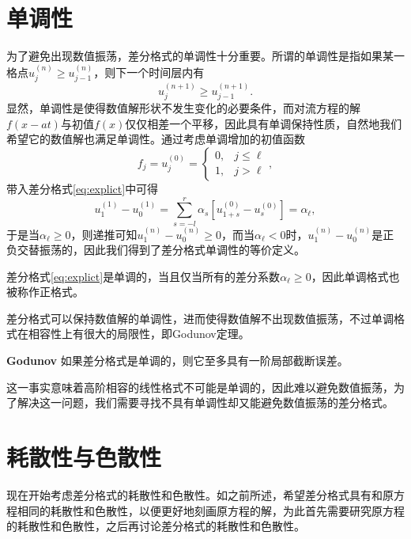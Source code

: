 \documentclass[a4paper,10pt]{ctexart}
\begin{document}
\section{单调性}
为了避免出现数值振荡，差分格式的单调性十分重要。所谓的单调性是指如果某一格点$ u^{(n)}_j\geqslant u^{(n)}_{j-1} $，则下一个时间层内有
\[
    u^{(n+1)}_j\geqslant u^{(n+1)}_{j-1}.
\]
显然，单调性是使得数值解形状不发生变化的必要条件，而对流方程的解$ f(x-at) $与初值$ f(x) $仅仅相差一个平移，因此具有单调保持性质，自然地我们希望它的数值解也满足单调性。通过考虑单调增加的初值函数
\[
    f_j = u^{(0)}_j = 
    \begin{cases}
        0, &j\leqslant \ell\\
        1, &j>\ell
    \end{cases},
\]
带入差分格式\eqref{eq:explict}中可得
\[
    u^{(1)}_1 - u^{(1)}_0 = \sum_{s=-l}^r \alpha_s [u^{(0)}_{1+s} - u^{(0)}_s] = \alpha_\ell,
\]
于是当$ \alpha_\ell\geqslant 0 $，则递推可知$ u^{(n)}_1 - u^{(n)}_0\geqslant 0 $，而当$ \alpha_\ell<0 $时，$ u^{(n)}_1 - u^{(n)}_0 $是正负交替振荡的，因此我们得到了差分格式单调性的等价定义。
\begin{definition}
    差分格式\eqref{eq:explict}是单调的，当且仅当所有的差分系数$ \alpha_\ell\geqslant 0 $，因此单调格式也被称作正格式。
\end{definition}
差分格式可以保持数值解的单调性，进而使得数值解不出现数值振荡，不过单调格式在相容性上有很大的局限性，即Godunov定理。
\begin{theorem}{\normalfont\bf{Godunov}}
    如果差分格式是单调的，则它至多具有一阶局部截断误差。
\end{theorem}
这一事实意味着高阶相容的线性格式不可能是单调的，因此难以避免数值振荡，为了解决这一问题，我们需要寻找不具有单调性却又能避免数值振荡的差分格式。

\section{耗散性与色散性}
现在开始考虑差分格式的耗散性和色散性。如之前所述，希望差分格式具有和原方程相同的耗散性和色散性，以便更好地刻画原方程的解，为此首先需要研究原方程的耗散性和色散性，之后再讨论差分格式的耗散性和色散性。
\end{document}
